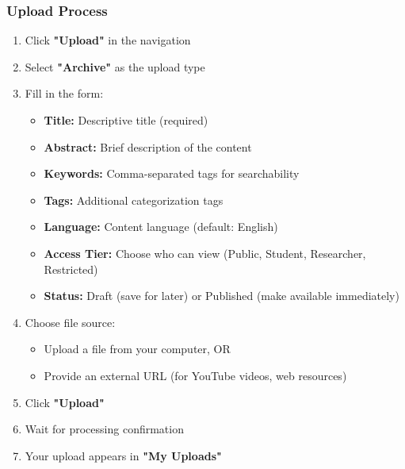 \documentclass[12pt,a4paper]{article}
\begin{document}
\subsubsection{Upload Process}
\begin{enumerate}[leftmargin=*]
    \item Click \textbf{"Upload"} in the navigation
    \item Select \textbf{"Archive"} as the upload type
    \item Fill in the form:
        \begin{itemize}
            \item \textbf{Title:} Descriptive title (required)
            \item \textbf{Abstract:} Brief description of the content
            \item \textbf{Keywords:} Comma-separated tags for searchability
            \item \textbf{Tags:} Additional categorization tags
            \item \textbf{Language:} Content language (default: English)
            \item \textbf{Access Tier:} Choose who can view (Public, Student, Researcher, Restricted)
            \item \textbf{Status:} Draft (save for later) or Published (make available immediately)
        \end{itemize}
    \item Choose file source:
        \begin{itemize}
            \item Upload a file from your computer, OR
            \item Provide an external URL (for YouTube videos, web resources)
        \end{itemize}
    \item Click \textbf{"Upload"}
    \item Wait for processing confirmation
    \item Your upload appears in \textbf{"My Uploads"}
\end{enumerate}
\end{document}
